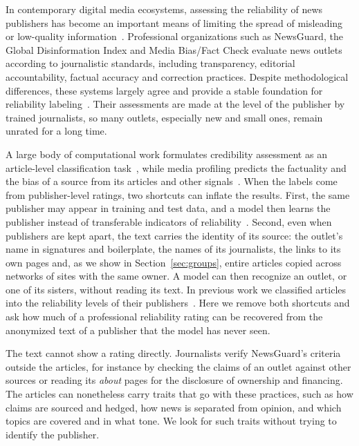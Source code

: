 \documentclass[11pt,a4paper]{article}
\begin{document}
In contemporary digital media ecosystems, assessing the reliability of news publishers has become an important means
of limiting the spread of misleading or low-quality information~\cite{Bowman2003,Jemielniak2020}. Professional
organizations such as NewsGuard, the Global Disinformation Index and Media Bias/Fact Check evaluate news outlets
according to journalistic standards, including transparency, editorial accountability, factual accuracy and correction
practices. Despite methodological differences, these systems largely agree and provide a stable foundation for
reliability labeling~\cite{lin2023high,DBLP:conf/icwsm/PratelliP22}. Their assessments are made at the level of the
publisher by trained journalists, so many outlets, especially new and small ones, remain unrated for a long time.

A large body of computational work formulates credibility assessment as an article-level classification
task~\cite{pandolfi2020automatic,Przybyla2021plugin,10.1145/3770077,DBLP:journals/dbsk/AdjiLS26}, while media profiling
predicts the factuality and the bias of a source from its articles and other signals~\cite{baly2018predicting,
baly2020written,nakov2024survey}. When the labels come from publisher-level ratings, two shortcuts can inflate the
results. First, the same publisher may appear in training and test data, and a model then learns the publisher instead
of transferable indicators of reliability~\cite{zhou2021hidden,azizov-etal-2024-safari,verhoeven2025yesterday}. Second,
even when publishers are kept apart, the text carries the identity of its source: the outlet's name in signatures and
boilerplate, the names of its journalists, the links to its own pages and, as we show in Section~\ref{sec:groups},
entire articles copied across networks of sites with the same owner. A model can then recognize an outlet, or one of its
sisters, without reading its text. In previous work we classified articles into the reliability levels of their
publishers~\cite{Bianchi2024SAC}. Here we remove both shortcuts and ask how much of a professional reliability rating
can be recovered from the anonymized text of a publisher that the model has never seen.

The text cannot show a rating directly. Journalists verify NewsGuard's criteria outside the articles, for instance by checking the claims of an outlet against
other sources or reading its \emph{about} pages for the disclosure of ownership and financing. The articles can nonetheless carry traits that go with these practices, such as how claims are
sourced and hedged, how news is separated from opinion, and which topics are covered and in what tone. We look for such traits without trying to identify the publisher.
\end{document}
